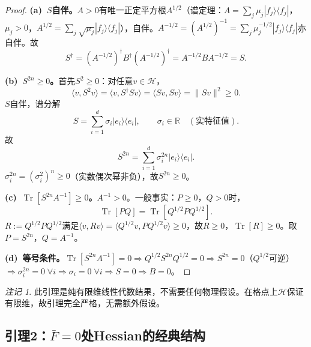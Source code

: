 \documentclass[12pt,a4paper]{article}
\theoremstyle{plain}
\theoremstyle{definition}\newtheorem{definition}[theorem]{定义}
\theoremstyle{remark}\newtheorem{remark}[theorem]{注记}
\begin{document}
\begin{proof}
\textbf{(a)~$S$自伴。}$A>0$有唯一正定平方根$A^{1/2}$（谱定理：$A=\sum_j\mu_j|f_j\rangle\langle f_j|$，$\mu_j>0$，$A^{1/2}=\sum_j\sqrt{\mu_j}|f_j\rangle\langle f_j|$），自伴。$A^{-1/2}=(A^{1/2})^{-1}=\sum_j\mu_j^{-1/2}|f_j\rangle\langle f_j|$亦自伴。故
\begin{equation}
S^\dagger = (A^{-1/2})^\dagger B^\dagger (A^{-1/2})^\dagger = A^{-1/2}BA^{-1/2} = S.
\end{equation}

\textbf{(b)~$S^{2n}\geq 0$。}首先$S^2\geq 0$：对任意$v\in\mathcal{H}$，
\begin{equation}\label{eq:S2psd}
\langle v,S^2v\rangle = \langle v,S^\dagger Sv\rangle = \langle Sv,Sv\rangle = \|Sv\|^2 \geq 0.
\end{equation}
$S$自伴，谱分解
\begin{equation}\label{eq:Sspectral}
S=\sum_{i=1}^d\sigma_i|e_i\rangle\langle e_i|, \qquad \sigma_i\in\mathbb{R}\quad(\text{实特征值}).
\end{equation}
故
\begin{equation}\label{eq:S2n}
S^{2n} = \sum_{i=1}^d \sigma_i^{2n}|e_i\rangle\langle e_i|.
\end{equation}
$\sigma_i^{2n}=(\sigma_i^2)^n\geq 0$（实数偶次幂非负），故$S^{2n}\geq 0$。

\textbf{(c)~$\operatorname{Tr}[S^{2n}A^{-1}]\geq 0$。}$A^{-1}>0$。一般事实：$P\geq 0$，$Q>0$时，
\begin{equation}\label{eq:TrPQ}
\operatorname{Tr}[PQ] = \operatorname{Tr}[Q^{1/2}PQ^{1/2}].
\end{equation}
$R:=Q^{1/2}PQ^{1/2}$满足$\langle v,Rv\rangle=\langle Q^{1/2}v,PQ^{1/2}v\rangle\geq 0$，故$R\geq 0$，$\operatorname{Tr}[R]\geq 0$。取$P=S^{2n}$，$Q=A^{-1}$。

\textbf{(d)~等号条件。}$\operatorname{Tr}[S^{2n}A^{-1}]=0\Rightarrow Q^{1/2}S^{2n}Q^{1/2}=0\Rightarrow S^{2n}=0$（$Q^{1/2}$可逆）$\Rightarrow\sigma_i^{2n}=0\;\forall i\Rightarrow\sigma_i=0\;\forall i\Rightarrow S=0\Rightarrow B=0$。
\end{proof}

\begin{remark}
此引理是纯有限维线性代数结果，不需要任何物理假设。在格点上$\mathcal{H}$保证有限维，故引理完全严格，无需额外假设。
\end{remark}

\subsection{引理2：$\bar{F}=0$处Hessian的经典结构}\label{sec:lemma2}
\end{document}

